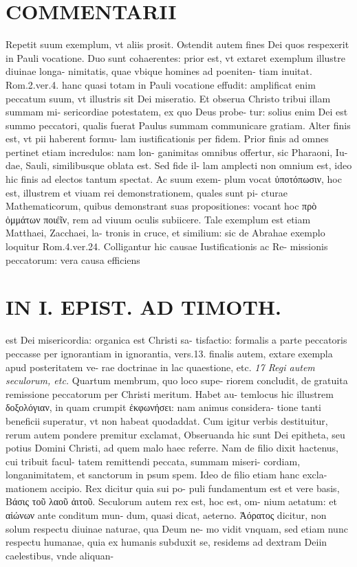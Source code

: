 \documentclass{article}
\begin{document}
\begin{pages}
\section*{COMMENTARII }\pstart Repetit suum exemplum, vt aliis prosit. Ostendit autem fines Dei quos respexerit in Pauli vocatione. Duo sunt cohaerentes: prior est, vt extaret exemplum illustre diuinae longa- nimitatis, quae vbique homines ad poeniten- tiam inuitat. Rom.2.ver.4. hanc quasi totam in Pauli vocatione effudit: amplificat enim peccatum suum, vt illustris sit Dei miseratio. Et obserua Christo tribui illam summam mi- sericordiae potestatem, ex quo Deus probe- tur: solius enim Dei est summo peccatori, qualis fuerat Paulus summam communicare gratiam. Alter finis est, vt pii haberent formu- lam iustificationis per fidem. Prior finis ad omnes pertinet etiam incredulos: nam lon- ganimitas omnibus offertur, sic Pharaoni, Iu- dae, Sauli, similibusque oblata est. Sed fide il- lam amplecti non omnium est, ideo hic finis ad electos tantum spectat. Ac suum exem- plum vocat ὐποτόπωσιν, hoc est, illustrem et viuam rei demonstrationem, quales sunt pi- cturae Mathematicorum, quibus demonstrant suas propositiones: vocant hoc πρὸ ὀμμάτων ποιέῖν, rem ad viuum oculis subiicere. Tale exemplum est etiam Matthaei, Zacchaei, la- tronis in cruce, et similium: sic de Abrahae exemplo loquitur Rom.4.ver.24. Colligantur hic causae Iustificationis ac Re-  \pend\pstart missionis peccatorum: vera causa efficiens  \pend
\section*{IN I. EPIST. AD TIMOTH. }
\marginpar{[ p.37 ]}\pstart est Dei misericordia: organica est Christi sa- tisfactio: formalis a parte peccatoris peccasse per ignorantiam in ignorantia, vers.13. finalis autem, extare exempla apud posteritatem ve- rae doctrinae in lac quaestione, etc.  \pend
\textit{17 Regi autem seculorum, etc. }\pstart Quartum membrum, quo loco supe- riorem concludit, de gratuita remissione peccatorum per Christi meritum. Habet au- temlocus hic illustrem δοξολόγιαν, in quam crumpit ἐκφωνήσει: nam animus considera- tione tanti beneficii superatur, vt non habeat quodaddat. Cum igitur verbis destituitur, rerum autem pondere premitur exclamat, Obseruanda hic sunt Dei epitheta, seu potius Domini Christi, ad quem malo haec referre. Nam de filio dixit hactenus, cui tribuit facul- tatem remittendi peccata, summam miseri- cordiam, longanimitatem, et sanctorum in psum spem. Ideo de filio etiam hanc excla- mationem accipio. Rex dicitur quia sui po- puli fundamentum est et vere basis, Βάσις τοῦ λαοῦ ἀιτοῦ. Seculorum autem rex est, hoc est, om- nium aetatum: et αἰώνων ante conditum mun- dum, quasi dicat, aeterno. Ἀόρατος dicitur, non solum respectu diuinae naturae, qua Deum ne- mo vidit vnquam, sed etiam nunc respectu humanae, quia ex humanis subduxit se, residems ad dextram Deiin caelestibus, vnde aliquan-  \pend
\marginpar{[ p.36 ]}

\end{pages}
\end{document}
